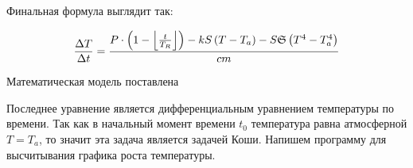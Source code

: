 \documentclass[a4paper, 14pt, titlepage, fleqn]{extarticle}
\DeclarePairedDelimiter\floor{\lfloor}{\rfloor}
\begin{document}
            Финальная формула выглядит так:

            \[ \dfrac{\Delta T}{\Delta t} = \dfrac{P \cdot \left(1 - \floor*{\tfrac{t}{T_R}}\right) - k S \left( T - T_a \right) - S \mathfrak{S} \left( T^4 - T_a^4 \right)}{c m} \]

            Математическая модель поставлена


            Последнее уравнение является дифференциальным уравнением температуры по времени.
            Так как в начальный момент времени $t_0$ температура равна атмосферной $T = T_a$, то значит эта задача является задачей Коши.
            Напишем программу для высчитывания графика роста температуры. 
            

\end{document}
